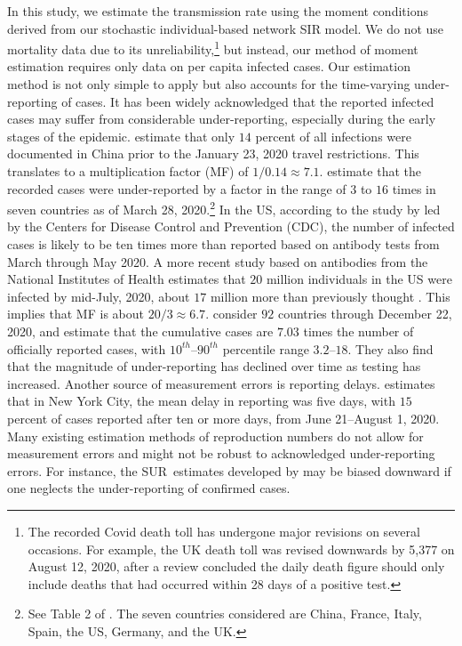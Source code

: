 \documentclass[12pt]{article}
\begin{document}
In this study, we estimate the transmission rate using the moment conditions
derived from our stochastic individual-based network SIR model. We do not use
mortality data due to its unreliability,\footnote{The recorded Covid death
toll has undergone major revisions on several occasions. For example, the UK
death toll was revised downwards by 5,377 on August 12, 2020, after a review
concluded the daily death figure should only include deaths that had occurred
within 28 days of a positive test.} but instead, our method of moment
estimation requires only data on per capita infected cases. Our estimation
method is not only simple to apply but also accounts for the time-varying
under-reporting of cases. It has been widely acknowledged that the reported
infected cases may suffer from considerable under-reporting, especially during
the early stages of the epidemic. \cite{Li2020undocumented} estimate that only
$14$ percent of all infections were documented in China prior to the January
23, 2020 travel restrictions. This translates to a multiplication factor (MF)
of $1/0.14\approx7.1$. \cite{Jagodnik2020correcting} estimate that the
recorded cases were under-reported by a factor in the range of $3$ to $16$
times in seven countries as of March 28, 2020.\footnote{See Table 2 of
\cite{Jagodnik2020correcting}. The seven countries considered are China,
France, Italy, Spain, the US, Germany, and the UK.} In the US, according to
the study by \cite{Havers2020CDC} led by the Centers for Disease Control and
Prevention (CDC), the number of infected cases is likely to be ten times more
than reported based on antibody tests from March through May 2020. A more
recent study based on antibodies from the National Institutes of Health
estimates that $20$ million individuals in the US were infected by mid-July,
2020, about $17$ million more than previously thought
\citep{Kalish2021undiagnosed}%
. This implies that MF is about $20/3\approx6.7.$
\citet*{Rahmandad2020underreporting}
consider $92$ countries through December 22, 2020, and estimate that the
cumulative cases are $7.03$ times the number of officially reported cases,
with $10^{th}$--$90^{th}$ percentile range $3.2$--$18$. They also find that
the magnitude of under-reporting has declined over time as testing has
increased. Another source of measurement errors is reporting delays.
\cite{Harris2020delay} estimates that in New York City, the mean delay in
reporting was five days, with $15$ percent of cases reported after ten or more
days, from June 21--August 1, 2020. Many existing estimation methods of
reproduction numbers do not allow for measurement errors and might not be
robust to acknowledged under-reporting errors. For instance, the
SUR\ estimates developed by \cite{Korolev2020JoE} may be biased downward if
one neglects the under-reporting of confirmed cases.
\end{document}
